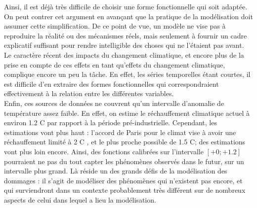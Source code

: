 Ainsi, il est déjà très difficile de choisir une forme fonctionnelle qui soit adaptée. On peut contrer cet argument en avançant que la pratique de la modélisation doit assumer cette simplification. De ce point de vue, un modèle ne vise pas à reproduire la réalité ou des mécanismes réels, mais seulement à fournir un cadre explicatif suffisant pour rendre intelligible des choses qui ne l'étaient pas avant. \\

Le caractère récent des impacts du changement climatique, et encore plus de la prise en compte de ces effets en tant qu'effets du changement climatique, complique encore un peu la tâche. En effet, les séries temporelles étant courtes, il est difficile d'en extraire des formes fonctionnelles qui correspondraient effectivement à la relation entre les différentes variables. \\

Enfin, ces sources de données ne couvrent qu'un intervalle d'anomalie de température assez faible. En effet, on estime le réchauffement climatique actuel à environ 1.2 \textdegree C par rapport à la période pré-industrielle. Cependant, les estimations vont plus haut : l'accord de Paris pour le climat vise à avoir une réchauffement limité à 2 \textdegree C , et le plus proche possible de 1.5 \textdegree C; des estimations vont plus loin encore. Ainsi, des fonctions calibrées sur l'intervalle $[+0; +1.2]$ pourraient ne pas du tout capter les phénomènes observés dans le futur, sur un intervalle plus grand. Là réside un des grands défis de la modélisation des dommages : il s'agit de modéliser des phénomènes qui n'existent pas encore, et qui surviendront dans un contexte probablement très différent sur de nombreux aspects de celui dans lequel a lieu la modélisation. 

\begin{landscape}
    
\end{landscape}

